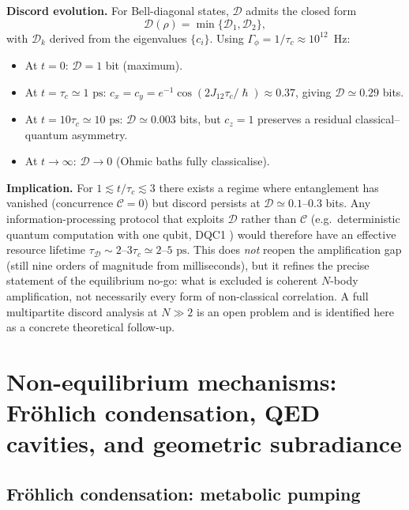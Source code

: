 \documentclass[twocolumn,10pt]{article}
\renewcommand{\hbar}{\hslash}
\newcommand{\ps}{\text{~ps}}
\begin{document}
\textbf{Discord evolution.} For Bell-diagonal states,
$\mathcal{D}$ admits the closed form \cite{Luo2008}
\begin{equation}
\mathcal{D}(\rho)=\min\bigl\{\mathcal{D}_1,\mathcal{D}_2\bigr\},
\end{equation}
with $\mathcal{D}_k$ derived from the eigenvalues $\{c_i\}$. Using
$\Gamma_\phi=1/\tau_c\approx 10^{12}$~Hz:
\begin{itemize}
\item At $t=0$: $\mathcal{D}=1$ bit (maximum).
\item At $t=\tau_c\simeq 1\ps$: $c_x=c_y=e^{-1}\cos(2J_{12}\tau_c/\hbar)
\approx 0.37$, giving $\mathcal{D}\simeq 0.29$ bits.
\item At $t=10\tau_c\simeq 10\ps$: $\mathcal{D}\simeq 0.003$ bits, but
$c_z=1$ preserves a residual classical--quantum asymmetry.
\item At $t\to\infty$: $\mathcal{D}\to 0$ (Ohmic baths fully classicalise).
\end{itemize}

\textbf{Implication.} For $1\lesssim t/\tau_c\lesssim 3$ there exists a
regime where entanglement has vanished (concurrence $\mathcal{C}=0$) but
discord persists at $\mathcal{D}\simeq 0.1$--$0.3$ bits. Any
information-processing protocol that exploits $\mathcal{D}$ rather than
$\mathcal{C}$ (e.g.\ deterministic quantum computation with one qubit,
DQC1 \cite{Knill1998,Datta2008}) would therefore have an effective
resource lifetime $\tau_{\mathcal{D}}\sim 2$--$3\tau_c\simeq 2$--$5\ps$.
This does \emph{not} reopen the amplification gap (still nine orders of
magnitude from milliseconds), but it refines the precise statement of
the equilibrium no-go: what is excluded is coherent $N$-body amplification,
not necessarily every form of non-classical correlation. A full multipartite
discord analysis at $N\gg 2$ is an open problem and is identified here as
a concrete theoretical follow-up.



\section{Non-equilibrium mechanisms: Fr\"ohlich condensation, QED cavities,
and geometric subradiance}

\subsection{Fr\"ohlich condensation: metabolic pumping}
\end{document}
